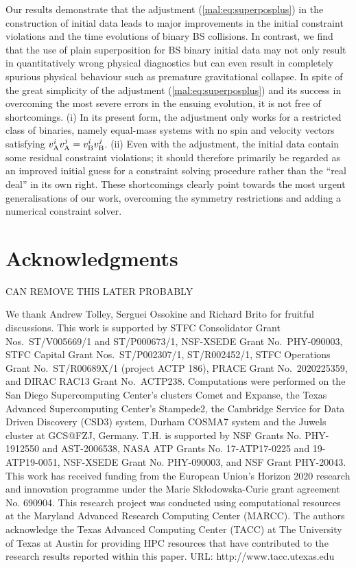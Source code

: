Our results demonstrate that
the adjustment (\ref{mal:eq:superposplus}) in the construction of initial
data leads to major improvements in the initial constraint violations and the
time evolutions of binary BS collisions. In contrast, we find that the use of plain
superposition for BS binary initial data may not only result in quantitatively
wrong physical diagnostics but can even result in completely spurious physical behaviour
such as premature gravitational collapse. In spite of the great simplicity of the
adjustment (\ref{mal:eq:superposplus}) and its success in overcoming the most
severe errors in the ensuing evolution, it is not free of shortcomings.
(i) In its present form, the adjustment only works for a restricted class of
binaries, namely equal-mass systems with no spin and velocity vectors
satisfying $v_{\rm A}^i v_{\rm A}^j=v_{\rm B}^i v_{\rm B}^j$. (ii) Even with
the adjustment, the initial data contain some residual constraint violations;
it should therefore primarily be regarded as an improved initial guess for
a constraint solving procedure rather than the ``real deal'' in its own right.
These shortcomings clearly point towards the most urgent generalisations of our
work, overcoming the symmetry restrictions and adding a numerical constraint
solver.


\section*{Acknowledgments}
CAN REMOVE THIS LATER PROBABLY 

We thank Andrew Tolley, Serguei Ossokine and Richard Brito for fruitful discussions.
This work is supported by
STFC Consolidator Grant Nos.~ST/V005669/1 and ST/P000673/1,
NSF-XSEDE Grant No.~PHY-090003,
STFC Capital Grant Nos.~ST/P002307/1, ST/R002452/1,
STFC Operations Grant No.~ST/R00689X/1 (project ACTP 186),
PRACE Grant No.~2020225359,
and
DIRAC RAC13 Grant No.~ACTP238.
Computations were performed on
the San Diego Supercomputing Center's clusters Comet and Expanse,
the Texas Advanced Supercomputing Center's Stampede2,
the Cambridge Service for Data Driven Discovery (CSD3) system, Durham COSMA7 system
and
the Juwels cluster at GCS@FZJ, Germany.
T.H. is supported by NSF Grants No. PHY-1912550 and AST-2006538, NASA ATP Grants No. 17-ATP17-0225 and 19-ATP19-0051, NSF-XSEDE Grant No. PHY-090003, and NSF Grant PHY-20043. This work has received funding from the European Union’s Horizon 2020 research and innovation programme under the Marie Skłodowska-Curie grant agreement No. 690904. This research project was conducted using computational resources at the Maryland Advanced Research Computing Center (MARCC).
The authors acknowledge the Texas Advanced Computing Center (TACC) at The University of Texas at Austin for providing HPC resources that have contributed to the research results reported within this paper. URL: http://www.tacc.utexas.edu \cite{10.1145/3311790.3396656}

